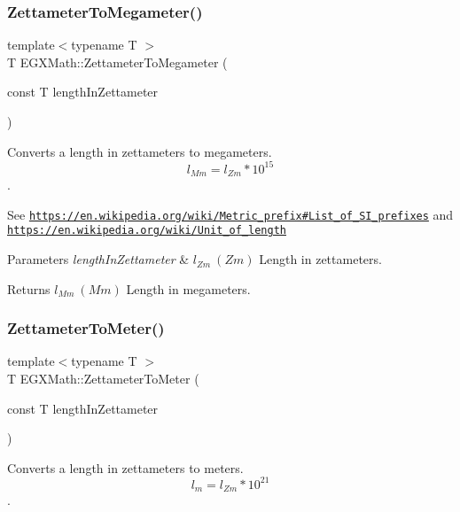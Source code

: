 \subsubsection{\texorpdfstring{Zettameter\+To\+Megameter()}{ZettameterToMegameter()}}
{\footnotesize\ttfamily template$<$typename T $>$ \\
T E\+G\+X\+Math\+::\+Zettameter\+To\+Megameter (\begin{DoxyParamCaption}\item[{const T}]{length\+In\+Zettameter }\end{DoxyParamCaption})}



Converts a length in zettameters to megameters. \[ l_{Mm}=l_{Zm} * 10^{15} \]. 

See \href{https://en.wikipedia.org/wiki/Metric_prefix#List_of_SI_prefixes}{\tt https\+://en.\+wikipedia.\+org/wiki/\+Metric\+\_\+prefix\#\+List\+\_\+of\+\_\+\+S\+I\+\_\+prefixes} and \href{https://en.wikipedia.org/wiki/Unit_of_length}{\tt https\+://en.\+wikipedia.\+org/wiki/\+Unit\+\_\+of\+\_\+length} 
\begin{DoxyParams}{Parameters}
{\em length\+In\+Zettameter} & $ l_{Zm}\ (Zm)$ Length in zettameters. \\
\hline
\end{DoxyParams}
\begin{DoxyReturn}{Returns}
$ l_{Mm}\ (Mm)$ Length in megameters. 
\end{DoxyReturn}
\mbox{\label{group___e_g_x_math-_conversions-_length_conversions-_s_i-_zettameter-_s_i_ga4965fffbfd10b795231942d8de4e1f2d}} 
\subsubsection{\texorpdfstring{Zettameter\+To\+Meter()}{ZettameterToMeter()}}
{\footnotesize\ttfamily template$<$typename T $>$ \\
T E\+G\+X\+Math\+::\+Zettameter\+To\+Meter (\begin{DoxyParamCaption}\item[{const T}]{length\+In\+Zettameter }\end{DoxyParamCaption})}



Converts a length in zettameters to meters. \[ l_{m}=l_{Zm} * 10^{21} \]. 


